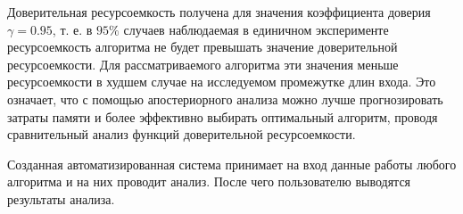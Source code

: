 
Доверительная ресурсоемкость получена для значения коэффициента доверия $\gamma = 0.95$, т. е. в $95\%$ случаев наблюдаемая в единичном эксперименте ресурсоемкость алгоритма не будет превышать значение доверительной ресурсоемкости. Для рассматриваемого алгоритма эти значения меньше ресурсоемкости в худшем случае на исследуемом промежутке длин входа. Это означает, что с помощью апостериорного анализа можно лучше прогнозировать затраты памяти и более эффективно  выбирать оптимальный алгоритм, проводя сравнительный анализ функций доверительной ресурсоемкости.

Созданная автоматизированная система принимает на вход данные работы любого алгоритма и на них проводит анализ. После чего пользователю выводятся результаты анализа.

\pagebreak